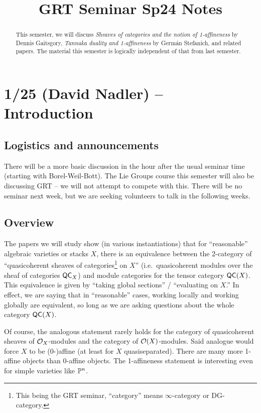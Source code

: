 \documentclass{article}
\title{GRT Seminar Sp24 Notes}
\begin{document}
\maketitle

\begin{abstract}
	This semester, we will discuss \emph{Sheaves of categories and the notion of 1-affineness} by Dennis Gaitsgory, \emph{Tannaka duality and 1-affineness} by Germ\'an Stefanich, and related papers.
	The material this semester is logically independent of that from last semester.
\end{abstract}

\tableofcontents

\section{1/25 (David Nadler) -- Introduction}

\subsection{Logistics and announcements}

There will be a more basic discussion in the hour after the usual seminar time (starting with Borel-Weil-Bott).
The Lie Groups course this semester will also be discussing GRT -- we will not attempt to compete with this.
There will be no seminar next week, but we are seeking volunteers to talk in the following weeks.

\subsection{Overview}

The papers we will study show (in various instantiations) that for ``reasonable'' algebraic varieties or stacks $X$, there is an equivalence between the 2-category of ``quasicoherent sheaves of categories\footnote{This being the GRT seminar, ``category'' means $\infty$-category or DG-category.} on $X$'' (i.e.\ quasicoherent modules over the sheaf of categories $\mathsf{QC}_X$) and module categories for the tensor category $\mathsf{QC}(X)$.
This equivalence is given by ``taking global sections'' / ``evaluating on $X$.''
In effect, we are saying that in ``reasonable'' cases, working locally and working globally are equivalent, so long as we are asking questions about the whole category $\mathsf{QC}(X)$.

Of course, the analogous statement rarely holds for the category of quasicoherent sheaves of $\mathcal{O}_X$-modules and the category of $\mathcal{O}(X)$-modules.
Said analogue would force $X$ to be (0-)affine (at least for $X$ quasiseparated).
There are many more 1-affine objects than 0-affine objects.
The 1-affineness statement is interesting even for simple varieties like $\mathbb{P}^n$.
\end{document}
